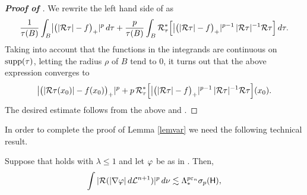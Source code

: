 \begin{proof}[\bf Proof of ]
 We rewrite the left hand side of  as
$$ 
 \frac 1{\tau(B)} \int_B \bigl|\bigl(|{\mathcal R}\tau| - f\bigr)_+|^p \,d\tau 
 +
 \frac p{\tau(B)} \int_B {\mathcal R}_\tau^*\Bigl[\bigl|\bigl(|{\mathcal R}\tau| - f\bigr)_+|^{p-1}\, |{\mathcal R}\tau|^{-1} {\mathcal R}\tau \Bigr]
\,
d\tau
.$$
Taking into account that the functions in the integrands are continuous on $\operatorname{supp}(\tau)$, 
letting the radius $\rho$ of $B$ tend to $0$, it turns out that the above expression converges to
$$\bigl|\bigl(|{\mathcal R}\tau(x_0)| - f(x_0)\bigr)_+|^p 
 +
p\, {\mathcal R}_\tau^*\Bigl[\bigl|\bigl(|{\mathcal R}\tau| - f\bigr)_+|^{p-1}\, |{\mathcal R}\tau|^{-1} {\mathcal R}\tau \Bigr](x_0).$$
The desired estimate  follows from the above and .
\end{proof}
\vv

In order to complete the proof of Lemma \ref{lemvar} we need the following technical result.

\begin{lemma}\label{lemtech79}
Suppose that  holds with $\lambda\leq1$ and let ${\varphi}$ be as in .
Then,
$$
\int |{\mathcal R}(|\nabla {\varphi}|\,d{\mathcal L}^{n+1})|^p\,d\nu\lesssim \Lambda_*^{p{\varepsilon}_n}\sigma_p({\mathsf{H}}),
$$
\end{lemma}


